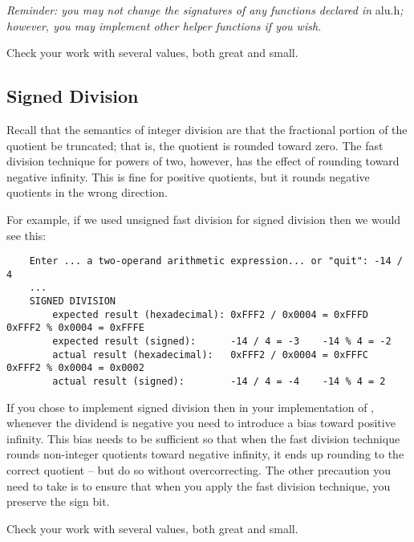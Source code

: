 \textit{Reminder: you may not change the signatures of any functions declared in }alu.h\textit{; however, you may implement other helper functions if you wish.}

Check your work with several values, both great and small.

\subsection{Signed Division}

Recall that the semantics of integer division are that the fractional portion of the quotient be truncated;
that is, the quotient is rounded toward zero.
The fast division technique for powers of two, however, has the effect of rounding toward negative infinity.
This is fine for positive quotients, but it rounds negative quotients in the wrong direction.

For example, if we used unsigned fast division for signed division then we would see this:
\begin{small}\begin{verbatim}
    Enter ... a two-operand arithmetic expression... or "quit": -14 / 4
    ...
    SIGNED DIVISION
        expected result (hexadecimal): 0xFFF2 / 0x0004 = 0xFFFD    0xFFF2 % 0x0004 = 0xFFFE
        expected result (signed):      -14 / 4 = -3    -14 % 4 = -2
        actual result (hexadecimal):   0xFFF2 / 0x0004 = 0xFFFC    0xFFF2 % 0x0004 = 0x0002
        actual result (signed):        -14 / 4 = -4    -14 % 4 = 2
\end{verbatim}\end{small}

If you chose to implement signed division then in your implementation of , whenever the dividend is negative you need to introduce a bias toward positive infinity.
This bias needs to be sufficient so that when the fast division technique rounds non-integer quotients toward negative infinity, it ends up rounding to the correct quotient -- but do so without overcorrecting.
The other precaution you need to take is to ensure that when you apply the fast division technique, you preserve the sign bit.

Check your work with several values, both great and small.
